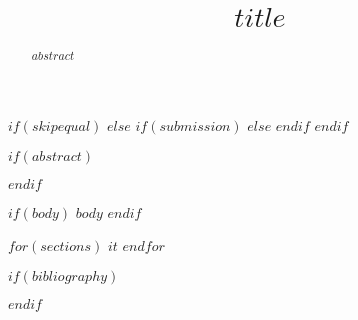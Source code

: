 \documentclass[10pt,twocolumn,letterpaper]{article}
\begin{document}
\title{$title$}



\maketitle
\ificcvfinal\thispagestyle{empty}\fi

$if(skipequal)$
$else$
$if(submission)$
$else$
$endif$
$endif$

$if(abstract)$
\begin{abstract}
$abstract$
\end{abstract}
$endif$

$if(body)$
$body$
$endif$

$for(sections)$
$it$
$endfor$

$if(bibliography)$
{\small


}
$endif$


\end{document}

